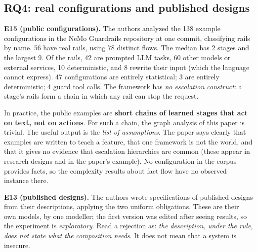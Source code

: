 \subsection{RQ4: real configurations and published designs}

\textbf{E15 (public configurations).} The authors analyzed the 138 example configurations in the NeMo Guardrails repository at one commit, classifying rails by name. 56 have real rails, using 78 distinct flows. The median has $2$ stages and the largest $9$. Of the rails, 42 are prompted LLM tasks, 60 other models or external services, 10 deterministic, and 8 rewrite their input (which the language cannot express). 47 configurations are entirely statistical; 3 are entirely deterministic; 4 guard tool calls. The framework has \emph{no escalation construct}: a stage's rails form a chain in which any rail can stop the request.

\begin{bigidea}
In practice, the public examples are \textbf{short chains of learned stages that act on text, not on actions}. For such a chain, the graph analysis of this paper is trivial. The useful output is the \emph{list of assumptions}. The paper says clearly that examples are written to teach a feature, that one framework is not the world, and that it gives no evidence that escalation hierarchies are common (these appear in research designs and in the paper's example). No configuration in the corpus provides facts, so the complexity results about fact flow have no observed instance there.
\end{bigidea}

\textbf{E13 (published designs).} The authors wrote specifications of published designs from their descriptions, applying the two uniform obligations. These are their own models, by one modeller; the first version was edited after seeing results, so the experiment is \emph{exploratory}. Read a rejection as: \emph{the description, under the rule, does not state what the composition needs}. It does not mean that a system is insecure.

